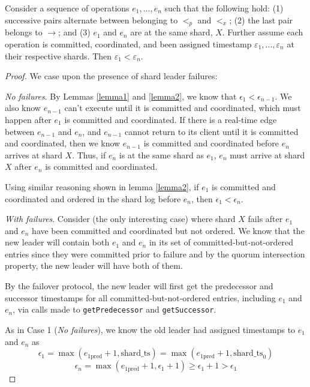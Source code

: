 \begin{lem}
\label{lemma3}
Consider a sequence of operations $e_1,...,e_n$ such that the following hold: (1) successive pairs alternate between belonging to $<_p$ and $<_x$; (2) the last pair belongs to $\rightarrow$; and (3) $e_1$ and $e_n$ are at the same shard, $X$. Further assume each operation is committed, coordinated, and been assigned timestamp $\varepsilon_1, ..., \varepsilon_n$ at their respective shards. Then $\varepsilon_1 < \varepsilon_n$.
\end{lem}

\begin{proof}
We case upon the presence of shard leader failures:

 \textit{No failures}.
By Lemmas \ref{lemma1} and \ref{lemma2}, we know that $\epsilon_1 < \epsilon_{n-1}$. We also know $e_{n-1}$ can't execute until it is committed and coordinated, which must happen after $e_1$ is committed and coordinated. If there is a real-time edge between $e_{n-1}$ and $e_n$, and $e_{n-1}$ cannot return to its client until it is committed and coordinated, then we know $e_{n-1}$ is committed and coordinated before $e_n$ arrives at shard $X$. Thus, if $e_n$ is at the same shard as $e_1$, $e_n$ must arrive at shard $X$ after $e_n$ is committed and coordinated.

Using similar reasoning shown in lemma \ref{lemma2}, if $e_1$ is committed and coordinated and ordered in the shard log before $e_n$, then $\epsilon_1 < \epsilon_n$.

 \textit{With failures}.
Consider (the only interesting case) where shard $X$ fails after $e_1$ and $e_n$ have been committed and coordinated but not ordered. We know that the new leader will contain both $e_1$ and $e_n$ in its set of committed-but-not-ordered entries since they were committed prior to failure and by the quorum intersection property, the new leader will have both of them.

By the failover protocol, the new leader will first get the predecessor and successor timestamps for all committed-but-not-ordered entries, including $e_1$ and $e_n$, via calls made to \texttt{getPredecessor} and \texttt{getSuccessor}.

As in Case 1 (\textit{No failures}), we know the old leader had assigned timestamps to $e_1$ and $e_n$ as
$$\epsilon_1 = \max(e_{1\text{pred}} + 1, \text{shard\_ts}) = \max(e_{1\text{pred}} + 1, \text{shard\_ts}_0)$$
$$\epsilon_n = \max(e_{1\text{pred}} + 1, \epsilon_1 + 1) \geq \epsilon_1 + 1 > \epsilon_1$$



\end{proof}
